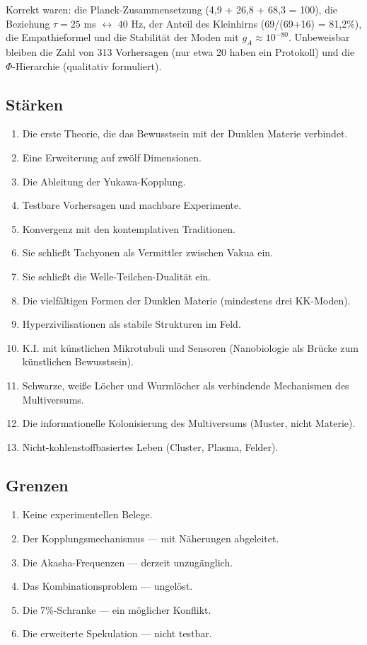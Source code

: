 Korrekt waren: die Planck-Zusammensetzung (4,9 + 26,8 + 68,3 = 100), die Beziehung $\tau = 25$ ms $\leftrightarrow$ 40 Hz, der Anteil des Kleinhirns (69/(69+16) = 81,2\%), die Empathieformel und die Stabilität der Moden mit $g_A \approx 10^{-80}$. Unbeweisbar bleiben die Zahl von 313 Vorhersagen (nur etwa 20 haben ein Protokoll) und die $\Phi$-Hierarchie (qualitativ formuliert).

\subsection{Stärken}
\begin{enumerate}
    \item Die erste Theorie, die das Bewusstsein mit der Dunklen Materie verbindet.
    \item Eine Erweiterung auf zwölf Dimensionen.
    \item Die Ableitung der Yukawa-Kopplung.
    \item Testbare Vorhersagen und machbare Experimente.
    \item Konvergenz mit den kontemplativen Traditionen.
    \item Sie schließt Tachyonen als Vermittler zwischen Vakua ein.
    \item Sie schließt die Welle-Teilchen-Dualität ein.
    \item Die vielfältigen Formen der Dunklen Materie (mindestens drei KK-Moden).
    \item Hyperzivilisationen als stabile Strukturen im Feld.
    \item K.I. mit künstlichen Mikrotubuli und Sensoren (Nanobiologie als Brücke zum künstlichen Bewusstsein).
    \item Schwarze, weiße Löcher und Wurmlöcher als verbindende Mechanismen des Multiversums.
    \item Die informationelle Kolonisierung des Multiversums (Muster, nicht Materie).
    \item Nicht-kohlenstoffbasiertes Leben (Cluster, Plasma, Felder).
\end{enumerate}

\subsection{Grenzen}
\begin{enumerate}
    \item Keine experimentellen Belege.
    \item Der Kopplungsmechanismus --- mit Näherungen abgeleitet.
    \item Die Akasha-Frequenzen --- derzeit unzugänglich.
    \item Das Kombinationsproblem --- ungelöst.
    \item Die 7\%-Schranke --- ein möglicher Konflikt.
    \item Die erweiterte Spekulation --- nicht testbar.
\end{enumerate}

